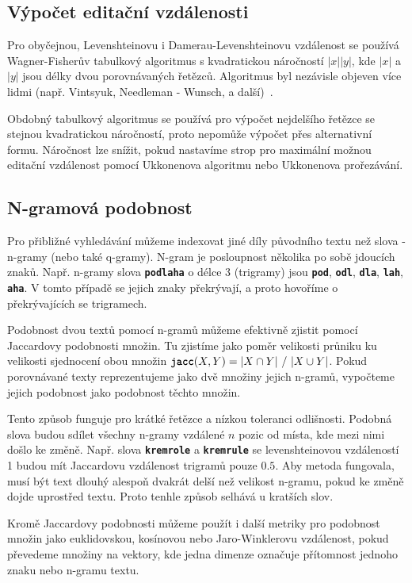\documentclass[11pt,letterpaper,oneside,openright]{book}
\newcommand{\bftt}[1]{\texttt{\textbf{#1}}}
\begin{document}

\subsection{Výpočet editační vzdálenosti}
Pro obyčejnou, Levenshteinovu i Damerau-Levenshteinovu vzdálenost se používá
Wagner-Fisherův tabulkový algoritmus s kvadratickou náročností $|x||y|$, kde
$|x|$ a $|y|$ jsou délky dvou porovnávaných řetězců. Algoritmus byl nezávisle
objeven více lidmi (např. Vintsyuk, Needleman - Wunsch, a
další)~\cite{Navarro:2001:GTA:375360.375365}.

Obdobný tabulkový algoritmus se používá pro výpočet nejdelšího řetězce se
stejnou kvadratickou náročností, proto nepomůže výpočet přes alternativní
formu. Náročnost lze snížit, pokud nastavíme strop pro maximální možnou
editační vzdálenost pomocí Ukkonenova algoritmu nebo Ukkonenova prořezávání.



\subsection{N-gramová podobnost}
Pro přibližné vyhledávání můžeme indexovat jiné díly původního textu než slova
- n-gramy (nebo také q-gramy). N-gram je posloupnost několika po sobě jdoucích
znaků. Např. n-gramy slova \bftt{podlaha} o délce 3 (trigramy) jsou \bftt{pod},
\bftt{odl}, \bftt{dla}, \bftt{lah}, \bftt{aha}. V tomto případě se jejich znaky
překrývají, a proto hovoříme o překrývajících se trigramech.

Podobnost dvou textů pomocí n-gramů můžeme efektivně zjistit pomocí Jaccardovy
podobnosti množin. Tu zjistíme jako poměr velikosti průniku ku velikosti
sjednocení obou množin $\bftt{jacc}(X, Y) = |X \cap Y|\ /\ |X \cup Y|$. Pokud
porovnávané texty reprezentujeme jako dvě množiny jejich n-gramů, vypočteme
jejich podobnost jako podobnost těchto množin.

Tento způsob funguje pro krátké řetězce a nízkou toleranci odlišnosti. Podobná
slova budou sdílet všechny n-gramy vzdálené $n$ pozic od místa, kde mezi nimi
došlo ke změně. Např. slova \bftt{kremrole} a \bftt{kremrule} se
levenshteinovou vzdáleností 1 budou mít Jaccardovu vzdálenost trigramů pouze
$0.5$. Aby metoda fungovala, musí být text dlouhý alespoň dvakrát delší než
velikost n-gramu, pokud ke změně dojde uprostřed textu. Proto tenhle způsob
selhává u kratších slov.

Kromě Jaccardovy podobnosti můžeme použít i další metriky pro podobnost množin
jako euklidovskou, kosínovou nebo Jaro-Winklerovu vzdálenost, pokud převedeme
množiny na vektory, kde jedna dimenze označuje přítomnost jednoho znaku nebo
n-gramu textu.
\end{document}

